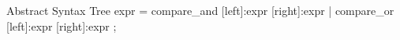 Abstract Syntax Tree
expr =
    {compare_and}				[left]:expr						[right]:expr
  | {compare_or}				[left]:expr						[right]:expr
;